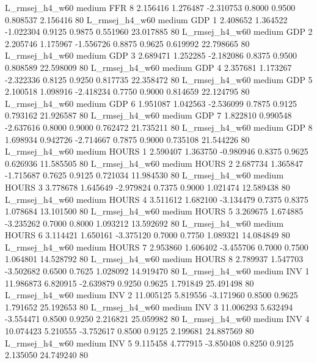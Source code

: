 L_rmsej_h4_w60     medium      FFR                 8  2.156416 1.276487 -2.310753 0.8000 0.9500  0.808537    2.156416 80
L_rmsej_h4_w60     medium      GDP                 1  2.408652 1.364522 -1.022304 0.9125 0.9875  0.551960   23.017885 80
L_rmsej_h4_w60     medium      GDP                 2  2.205746 1.175967 -1.556726 0.8875 0.9625  0.619992   22.798665 80
L_rmsej_h4_w60     medium      GDP                 3  2.689471 1.252285 -2.182086 0.8375 0.9500  0.808589   22.598009 80
L_rmsej_h4_w60     medium      GDP                 4  2.357681 1.173267 -2.322336 0.8125 0.9250  0.817735   22.358472 80
L_rmsej_h4_w60     medium      GDP                 5  2.100518 1.098916 -2.418234 0.7750 0.9000  0.814659   22.124795 80
L_rmsej_h4_w60     medium      GDP                 6  1.951087 1.042563 -2.536099 0.7875 0.9125  0.793162   21.926587 80
L_rmsej_h4_w60     medium      GDP                 7  1.822810 0.990548 -2.637616 0.8000 0.9000  0.762472   21.735211 80
L_rmsej_h4_w60     medium      GDP                 8  1.698934 0.942726 -2.714667 0.7875 0.9000  0.735108   21.544226 80
L_rmsej_h4_w60     medium    HOURS                 1  2.590407 1.363750 -0.980946 0.8375 0.9625  0.626936   11.585505 80
L_rmsej_h4_w60     medium    HOURS                 2  2.687734 1.365847 -1.715687 0.7625 0.9125  0.721034   11.984530 80
L_rmsej_h4_w60     medium    HOURS                 3  3.778678 1.645649 -2.979824 0.7375 0.9000  1.021474   12.589438 80
L_rmsej_h4_w60     medium    HOURS                 4  3.511612 1.682100 -3.134479 0.7375 0.8375  1.078684   13.101500 80
L_rmsej_h4_w60     medium    HOURS                 5  3.269675 1.674885 -3.235262 0.7000 0.8000  1.093212   13.592692 80
L_rmsej_h4_w60     medium    HOURS                 6  3.114421 1.650161 -3.375120 0.7000 0.7750  1.089321   14.084849 80
L_rmsej_h4_w60     medium    HOURS                 7  2.953860 1.606402 -3.455706 0.7000 0.7500  1.064801   14.528792 80
L_rmsej_h4_w60     medium    HOURS                 8  2.789937 1.547703 -3.502682 0.6500 0.7625  1.028092   14.919470 80
L_rmsej_h4_w60     medium      INV                 1 11.986873 6.820915 -2.639879 0.9250 0.9625  1.791849   25.491498 80
L_rmsej_h4_w60     medium      INV                 2 11.005125 5.819556 -3.171960 0.8500 0.9625  1.791652   25.192653 80
L_rmsej_h4_w60     medium      INV                 3 11.006293 5.632494 -3.554471 0.8500 0.9250  2.216821   25.059982 80
L_rmsej_h4_w60     medium      INV                 4 10.074423 5.210555 -3.752617 0.8500 0.9125  2.199681   24.887569 80
L_rmsej_h4_w60     medium      INV                 5  9.115458 4.777915 -3.850408 0.8250 0.9125  2.135050   24.749240 80
